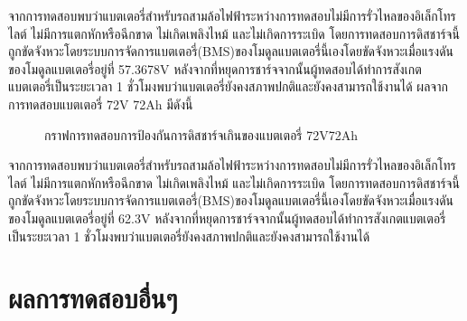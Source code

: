 \hspace*{2cm}
จากการทดสอบพบว่าแบตเตอรี่สำหรับรถสามล้อไฟฟ้าระหว่างการทดสอบไม่มีการรั่วไหลของอิเล็กโทรไลต์ ไม่มีการแตกหักหรือฉีกขาด ไม่เกิดเพลิงไหม้ และไม่เกิดการระเบิด
โดยการทดสอบการดิสชาร์จนี้ถูกขัดจังหวะโดยระบบการจัดการแบตเตอรี่(BMS)ของโมดูลแบตเตอรี่นี้เองโดยขัดจังหวะเมื่อแรงดันของโมดูลแบตเตอรี่อยู่ที่ 57.3678V 
หลังจากที่หยุดการชาร์จจากนั้นผู้ทดสอบได้ทำการสังเกตแบตเตอรี่เป็นระยะเวลา 1 ชั่วโมงพบว่าแบตเตอรี่ยังคงสภาพปกติและยังคงสามารถใช้งานได้
\newline\hspace*{2cm}
ผลจากการทดสอบแบตเตอรี่ 72V 72Ah มีดังนี้
\begin{center}
	\begin{figure}[H]
		\centering
		\captionsetup{justification=centering,margin=2cm}
		\caption{กราฟการทดสอบการป้องกันการดิสชาร์จเกินของแบตเตอรี่ 72V72Ah}
	\end{figure}
\end{center}
\hspace*{2cm}
จากการทดสอบพบว่าแบตเตอรี่สำหรับรถสามล้อไฟฟ้าระหว่างการทดสอบไม่มีการรั่วไหลของอิเล็กโทรไลต์ ไม่มีการแตกหักหรือฉีกขาด ไม่เกิดเพลิงไหม้ และไม่เกิดการระเบิด
โดยการทดสอบการดิสชาร์จนี้ถูกขัดจังหวะโดยระบบการจัดการแบตเตอรี่(BMS)ของโมดูลแบตเตอรี่นี้เองโดยขัดจังหวะเมื่อแรงดันของโมดูลแบตเตอรี่อยู่ที่ 62.3V 
หลังจากที่หยุดการชาร์จจากนั้นผู้ทดสอบได้ทำการสังเกตแบตเตอรี่เป็นระยะเวลา 1 ชั่วโมงพบว่าแบตเตอรี่ยังคงสภาพปกติและยังคงสามารถใช้งานได้
\section{ผลการทดสอบอื่นๆ}
